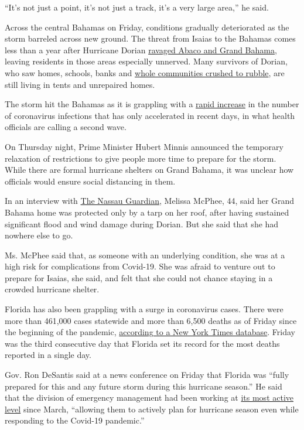 ``It's not just a point, it's not just a track, it's a very large
area,'' he said.

Across the central Bahamas on Friday, conditions gradually deteriorated
as the storm barreled across new ground. The threat from Isaias to the
Bahamas comes less than a year after Hurricane Dorian
\href{https://www.nytimes.com/interactive/2019/09/25/world/americas/hurricane-dorian-abaco-island-bahamas.html}{ravaged
Abaco and Grand Bahama}, leaving residents in those areas especially
unnerved. Many survivors of Dorian, who saw homes, schools, banks and
\href{https://www.nytimes.com/2019/09/06/world/americas/hurricane-dorian-bahamas.html}{whole
communities crushed to rubble}, are still living in tents and unrepaired
homes.

The storm hit the Bahamas as it is grappling with a
\href{https://www.nytimes.com/2020/07/04/world/americas/virus-caribbean-hurricane.html}{rapid
increase} in the number of coronavirus infections that has only
accelerated in recent days, in what health officials are calling a
second wave.

On Thursday night, Prime Minister Hubert Minnis announced the temporary
relaxation of restrictions to give people more time to prepare for the
storm. While there are formal hurricane shelters on Grand Bahama, it was
unclear how officials would ensure social distancing in them.

In an interview with
\href{https://thenassauguardian.com/2020/07/31/isaias-stirs-new-fears-among-dorian-survivors/}{The
Nassau Guardian}, Melissa McPhee, 44, said her Grand Bahama home was
protected only by a tarp on her roof, after having sustained significant
flood and wind damage during Dorian. But she said that she had nowhere
else to go.

Ms. McPhee said that, as someone with an underlying condition, she was
at a high risk for complications from Covid-19. She was afraid to
venture out to prepare for Isaias, she said, and felt that she could not
chance staying in a crowded hurricane shelter.

Florida has also been grappling with a surge in coronavirus cases. There
were more than 461,000 cases statewide and more than 6,500 deaths as of
Friday since the beginning of the pandemic,
\href{https://www.nytimes.com/interactive/2020/us/florida-coronavirus-cases.html}{according
to a New York Times database}. Friday was the third consecutive day that
Florida set its record for the most deaths reported in a single day.

Gov. Ron DeSantis said at a news conference on Friday that Florida was
``fully prepared for this and any future storm during this hurricane
season.'' He said that the division of emergency management had been
working at
\href{https://www.floridadisaster.org/sert/eoc-activation-levels/}{its
most active level} since March, ``allowing them to actively plan for
hurricane season even while responding to the Covid-19 pandemic.''

